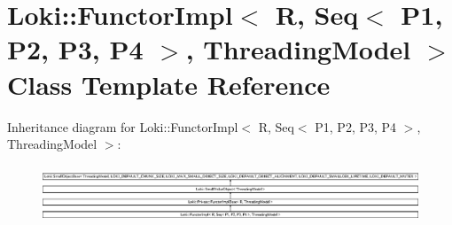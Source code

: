 \hypertarget{classLoki_1_1FunctorImpl_3_01R_00_01Seq_3_01P1_00_01P2_00_01P3_00_01P4_01_4_00_01ThreadingModel_01_4}{}\section{Loki\+:\+:Functor\+Impl$<$ R, Seq$<$ P1, P2, P3, P4 $>$, Threading\+Model $>$ Class Template Reference}
\label{classLoki_1_1FunctorImpl_3_01R_00_01Seq_3_01P1_00_01P2_00_01P3_00_01P4_01_4_00_01ThreadingModel_01_4}
Inheritance diagram for Loki\+:\+:Functor\+Impl$<$ R, Seq$<$ P1, P2, P3, P4 $>$, Threading\+Model $>$\+:\begin{figure}[H]
\begin{center}
\leavevmode
\includegraphics[height=1.751368cm]{classLoki_1_1FunctorImpl_3_01R_00_01Seq_3_01P1_00_01P2_00_01P3_00_01P4_01_4_00_01ThreadingModel_01_4}
\end{center}
\end{figure}
